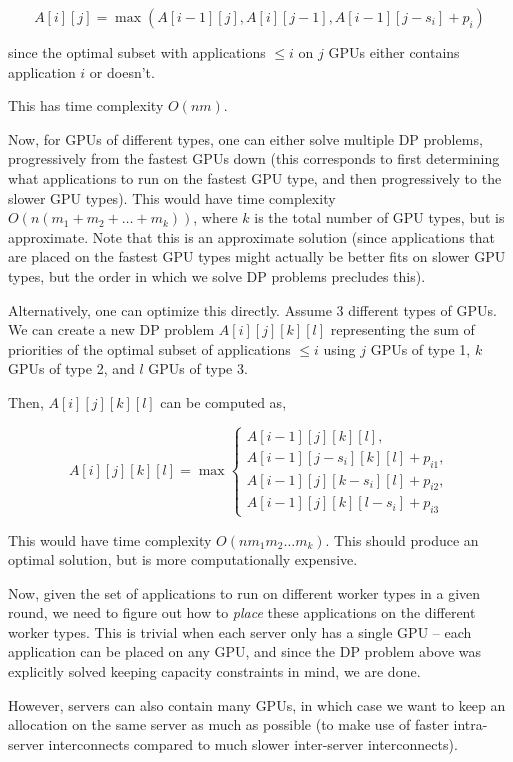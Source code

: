 \documentclass{article}
\begin{document}
$$A[i][j] = \max(A[i-1][j], A[i][j-1], A[i-1][j-s_i] + p_i)$$

since the optimal subset with applications $\leq i$
on $j$ GPUs either contains application $i$ or doesn't.

This has time complexity $O(nm)$.

Now, for GPUs of different types, one can either solve multiple DP problems,
progressively from the fastest GPUs down (this corresponds to first determining
what applications to run on the fastest GPU type, and then progressively to the slower
GPU types). This would have time complexity $O(n(m_1 + m_2 + \ldots + m_k))$, where
$k$ is the total number of GPU types, but is approximate. Note that this is an
approximate solution (since applications that are placed on the fastest GPU
types might actually be better fits on slower GPU types, but the order in which
we solve DP problems precludes this).

Alternatively, one can optimize this directly. Assume 3 different types of GPUs.
We can create a new DP problem $A[i][j][k][l]$ representing the sum of priorities
of the optimal subset of applications $\leq i$ using $j$ GPUs of type 1, $k$
GPUs of type 2, and $l$ GPUs of type 3.

Then, $A[i][j][k][l]$ can be computed as,

\begin{equation}
  A[i][j][k][l] = \max \begin{cases}
    A[i-1][j][k][l], \\
    A[i-1][j-s_i][k][l] + p_{i1}, \\
    A[i-1][j][k-s_i][l] + p_{i2}, \\
    A[i-1][j][k][l-s_i] + p_{i3}
  \end{cases} \nonumber
\end{equation}


This would have time complexity $O(nm_1m_2\ldots m_k)$. This should produce an
optimal solution, but is more computationally expensive.


Now, given the set of applications to run on different worker types in a given
round, we need to figure out how to \emph{place} these applications on the
different worker types. This is trivial when each server only has a single
GPU -- each application can be placed on any GPU, and since the DP problem
above was explicitly solved keeping capacity constraints in mind, we are done.

However, servers can also contain many GPUs, in which case we want to keep
an allocation on the same server as much as possible (to make use of faster
intra-server interconnects compared to much slower inter-server interconnects).
\end{document}
